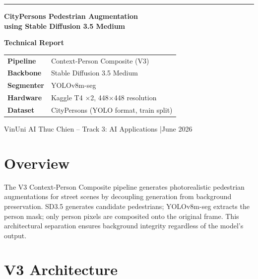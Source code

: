 \documentclass[12pt,a4paper]{article}
\begin{document}
\begin{titlepage}
    \centering
    \vspace*{2cm}
    {\color{primaryblue}\rule{\linewidth}{2pt}}\vspace{0.5cm}

    {\LARGE\bfseries\color{primaryblue}
        CityPersons Pedestrian Augmentation\\[6pt]
        \large using Stable Diffusion 3.5 Medium}

    \vspace{0.4cm}{\color{primaryblue}\rule{\linewidth}{2pt}}\vspace{1.5cm}

    {\large\bfseries Technical Report}

    \vspace{1.2cm}
    \begin{tabular}{ll}
        \textbf{Pipeline}   & Context-Person Composite (V3) \\[4pt]
        \textbf{Backbone}   & Stable Diffusion 3.5 Medium \\[4pt]
        \textbf{Segmenter}  & YOLOv8m-seg \\[4pt]
        \textbf{Hardware}   & Kaggle T4 $\times$2, 448$\times$448 resolution \\[4pt]
        \textbf{Dataset}    & CityPersons (YOLO format, train split) \\
    \end{tabular}

    \vfill
    {\small\color{gray}VinUni AI Thuc Chien -- Track 3: AI Applications \quad|\quad June 2026}
\end{titlepage}

\tableofcontents
\clearpage

\section{Overview}

The V3 Context-Person Composite pipeline generates photorealistic pedestrian augmentations for street scenes by decoupling generation from background preservation. SD3.5 generates candidate pedestrians; YOLOv8m-seg extracts the person mask; only person pixels are composited onto the original frame. This architectural separation ensures background integrity regardless of the model's output.

\section{V3 Architecture}
\end{document}

